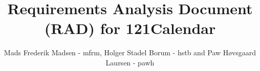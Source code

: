 \documentclass{article}
\begin{document}
\title{Requirements Analysis Document (RAD) for 121Calendar}
\author{Mads Frederik Madsen - mfrm, Holger Stadel Borum - hstb and Paw H\o vsgaard Laursen - pawh}
\maketitle
\tableofcontents








\end{document}
